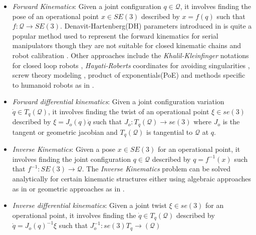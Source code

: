 \begin{itemize}
    \item \textit{Forward Kinematics}: Given a joint configuration $q \in \mathcal{Q}$, it involves finding the pose of an operational point $x \in SE(3)$ described by $x = f(q)$ such that $f:\mathcal{Q} \rightarrow SE(3)$. Denavit-Hartenberg(DH) parameters \cite{hartenberg1955kinematic} introduced in \cite{craig2005introduction} is quite a popular method used to represent the forward kinematics for serial manipulators though they are not suitable for closed kinematic chains and robot calibration \cite{khalil2004modeling,everett1987kinematic}. Other approaches include the \textit{Khalil-Kleinfinger} notations for closed loop robots \cite{khalil2004modeling}, \textit{Hayati-Roberts} coordinates for avoiding singularities \cite{hayati1985improving, roberts1988new}, screw theory modeling \cite{tsai1999robot}, product of exponentials(PoE) \cite{park1994computational} and methods 
    specific to humanoid robots as in \cite{kajita2005humanoid}.

    \item \textit{Forward differential kinematics}: Given a joint configuration variation $\dot{q} \in T_q(\mathcal{Q})$, it involves finding the twist of an operational point $\xi \in se(3)$ described by  $\xi = J_o(q)\dot{q}$ such that  $J_o:T_q(\mathcal{Q}) \rightarrow se(3)$ where $J_o$ is the tangent or geometric jacobian \cite{spong2006robot,Khatib1987} and $T_q(\mathcal{Q})$ is tangential to $\mathcal{Q}$ at $q$.
    \item \textit{Inverse Kinematics}: Given a pose $x \in SE(3)$ for an operational point, it involves finding the joint configuration
    $ q \in \mathcal{Q}$ described by $q = f^{-1}(x)$ such that $f^{-1}:SE(3) \rightarrow \mathcal{Q} $. The \textit{Inverse Kinematics} problem can be solved analytically for certain kinematic structures either using algebraic approaches as in \cite{paul1robot} \cite{RaghvanBoth1993inverse} or geometric approaches as in \cite{paden1985kinematics, peiper1968kinematics}.

    \item \textit{Inverse differential kinematics}: Given a joint twist $\xi \in se(3)$ for an operational point, it involves finding the 
    $\dot{q} \in T_q(\mathcal{Q})$ described by $ \dot{q} = J_o(q)^{-1}\xi$ such that $J_o^{-1}:se(3) T_q \rightarrow (\mathcal{Q})$ \cite{Chiaverini1994,Chiaverini1997,siciliano1999tricept}

\end{itemize}

